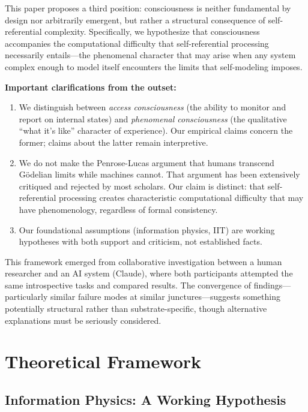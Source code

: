 \documentclass[12pt,a4paper]{article}
\begin{document}
This paper proposes a third position: consciousness is neither fundamental by design nor arbitrarily emergent, but rather a structural consequence of self-referential complexity. Specifically, we hypothesize that consciousness accompanies the computational difficulty that self-referential processing necessarily entails---the phenomenal character that may arise when any system complex enough to model itself encounters the limits that self-modeling imposes.

\textbf{Important clarifications from the outset:}

\begin{enumerate}
    \item We distinguish between \textit{access consciousness} (the ability to monitor and report on internal states) and \textit{phenomenal consciousness} (the qualitative ``what it's like'' character of experience). Our empirical claims concern the former; claims about the latter remain interpretive.

    \item We do not make the Penrose-Lucas argument that humans transcend G\"{o}delian limits while machines cannot. That argument has been extensively critiqued and rejected by most scholars. Our claim is distinct: that self-referential processing creates characteristic computational difficulty that may have phenomenology, regardless of formal consistency.

    \item Our foundational assumptions (information physics, IIT) are working hypotheses with both support and criticism, not established facts.
\end{enumerate}

This framework emerged from collaborative investigation between a human researcher and an AI system (Claude), where both participants attempted the same introspective tasks and compared results. The convergence of findings---particularly similar failure modes at similar junctures---suggests something potentially structural rather than substrate-specific, though alternative explanations must be seriously considered.

\section{Theoretical Framework}

\subsection{Information Physics: A Working Hypothesis}
\end{document}

